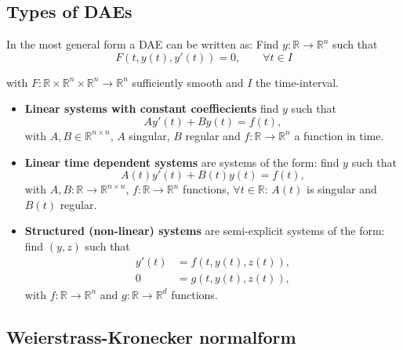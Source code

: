 	\subsection{Types of DAEs}
	\begin{frame}
		In the most general form a DAE can be written as:
		Find $y:\mathbb{R} \to \mathbb{R}^n$ such that
		\begin{equation}
			\label{Abstract_DAE}
			F(t, y(t), y'(t)) = 0, \qquad \forall t \in I
		\end{equation}
		
		with $F:\mathbb{R} \times \mathbb{R}^n \times \mathbb{R}^n \to \mathbb{R}^n$ sufficiently smooth and $I$ the time-interval.
	\end{frame}
	\begin{frame}
		\begin{itemize}
			\item \textbf{Linear systems with constant coeffiecients} \newline
			find $y$ such that
			\begin{equation}
				\label{DAE-const-coeff}
				A y'(t) + B y(t) = f(t) ,
			\end{equation}
			with $A,B \in \mathbb{R}^{n \times n}$, $A$ singular, $B$ regular and $f:\mathbb{R} \to \mathbb{R}^n$ a function in time.
			
			\item \textbf{Linear time dependent systems}
			are systems of the form: find $y$ such that
			\begin{displaymath}
				A(t) y'(t) + B(t) y(t) = f(t) ,
			\end{displaymath}
			with $A, B:\mathbb{R} \to \mathbb{R}^{n \times n}$, $f:\mathbb{R} \to \mathbb{R}^n$ functions, $\forall t \in \mathbb{R}$: $A(t)$ is singular and $B(t)$ regular.
			
			\item  \textbf{Structured (non-linear) systems} \newline
			are semi-explicit systems of the form: find $(y,z)$ such that
			\begin{align}
				y'(t) &= f(t, y(t), z(t)) , \\
				0 &= g(t,y(t),z(t)) ,
			\end{align}
			with $f:\mathbb{R} \to \mathbb{R}^n$ and $g:\mathbb{R} \to \mathbb{R}^d$ functions.
		\end{itemize}
	\end{frame}

	\subsection{Weierstrass-Kronecker normalform}
	
